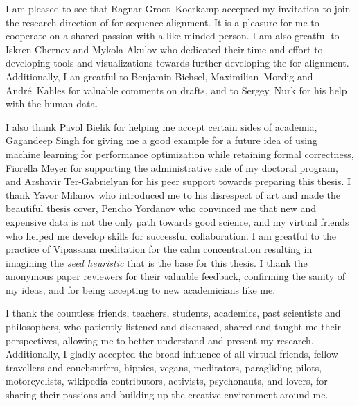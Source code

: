 I am pleased to see that Ragnar Groot~Koerkamp accepted my invitation to join
the research direction of \A for sequence alignment. It is a pleasure for me to
cooperate on a shared passion with a like-minded person. I am also greatful to
Iskren Chernev and Mykola Akulov who dedicated their time and effort to
developing tools and visualizations towards further developing the \A for
alignment. Additionally, I an greatful to Benjamin Bichsel, Maximilian~Mordig
and André~Kahles for valuable comments on drafts, and to Sergey~Nurk for his
help with the human data.

I also thank Pavol Bielik for helping me accept certain sides of academia,
Gagandeep Singh for giving me a good example for a future idea of using machine
learning for performance optimization while retaining formal correctness,
Fiorella Meyer for supporting the administrative side of my doctoral program,
and Arshavir Ter-Gabrielyan for his peer support towards preparing this thesis.
I thank Yavor Milanov who introduced me to his disrespect of art and made the
beautiful thesis cover, Pencho Yordanov who convinced me that new and expensive
data is not the only path towards good science, and my virtual friends who
helped me develop skills for successful collaboration. I am greatful to the
practice of Vipassana meditation for the calm concentration resulting in
imagining the \emph{seed heuristic} that is the base for this thesis. I thank
the anonymous paper reviewers for their valuable feedback, confirming the sanity
of my ideas, and for being accepting to new academicians like me. 

I thank the countless friends, teachers, students, academics, past scientists
and philosophers, who patiently listened and discussed, shared and taught me
their perspectives, allowing me to better understand and present my research.
Additionally, I gladly accepted the broad influence of all virtual friends,
fellow travellers and couchsurfers, hippies, vegans, meditators, paragliding
pilots, motorcyclists, wikipedia contributors, activists, psychonauts, and
lovers, for sharing their passions and building up the creative environment
around me.

\endgroup